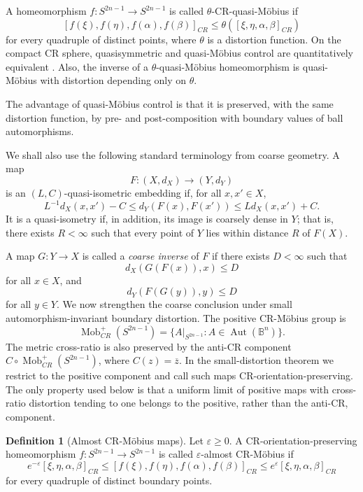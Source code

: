 \documentclass[11pt]{article}
\theoremstyle{definition}
\newtheorem{definition}[theorem]{Definition}
\theoremstyle{remark}
\theoremstyle{definition}
\newcommand{\B}{\mathbb B}
\newcommand{\Aut}{\operatorname{Aut}}
\begin{document}
A homeomorphism \(f:S^{2n-1}\to S^{2n-1}\) is called
\(\theta\)-CR-quasi-M\"obius if
\begin{equation}\label{general-cr-quasimobius}
        [f(\xi),f(\eta),f(\alpha),f(\beta)]_{CR}
        \le
        \theta\!\left([\xi,\eta,\alpha,\beta]_{CR}\right)
\end{equation}
for every quadruple of distinct points, where \(\theta\) is a distortion
function.  On the compact CR sphere, quasisymmetric and quasi-M\"obius control
are quantitatively equivalent \cite{Vaisala,Haissinsky}.  Also, the inverse of
a \(\theta\)-quasi-M\"obius homeomorphism is quasi-M\"obius with distortion
depending only on \(\theta\).

The advantage of quasi-M\"obius control is that it is preserved, with the same
distortion function, by pre- and post-composition with boundary values of ball
automorphisms.



We shall also use the following standard terminology from coarse geometry. A map
\[
F:(X,d_X)\to(Y,d_Y)
\]
is an \((L,C)\)-quasi-isometric embedding if, for all \(x,x'\in X\),
\[
L^{-1}d_X(x,x')-C
\le d_Y(F(x),F(x'))
\le Ld_X(x,x')+C.
\]
It is a quasi-isometry if, in addition, its image is coarsely dense in \(Y\); that is, there exists \(R<\infty\) such that every point of \(Y\) lies within distance \(R\) of \(F(X)\).

A map \(G:Y\to X\) is called a \emph{coarse inverse} of \(F\) if there exists \(D<\infty\) such that
\[
d_X(G(F(x)),x)\le D
\]
for all \(x\in X\), and
\[
d_Y(F(G(y)),y)\le D
\]
for all \(y\in Y\).
We now strengthen the coarse conclusion under small automorphism-invariant
boundary distortion.  The positive CR-M\"obius group is
\[
        \operatorname{Mob}_{CR}^+(S^{2n-1})
        =\{A|_{S^{2n-1}}:A\in\Aut(\B^n)\}.
\]
The metric cross-ratio is also preserved by the anti-CR component
\(C\circ\operatorname{Mob}_{CR}^+(S^{2n-1})\), where
\(C(z)=\overline z\).  In the small-distortion theorem we restrict to the
positive component and call such maps CR-orientation-preserving.  The only
property used below is that a uniform limit of positive maps with cross-ratio
distortion tending to one belongs to the positive, rather than the anti-CR,
component.

\begin{definition}[Almost CR-M\"obius maps]\label{defep}
Let \(\varepsilon\ge0\).  A CR-orientation-preserving homeomorphism
\(f:S^{2n-1}\to S^{2n-1}\) is called \(\varepsilon\)-almost CR-M\"obius if
\begin{equation}\label{almost-cr-mobius}
        e^{-\varepsilon}[\xi,\eta,\alpha,\beta]_{CR}
        \le
        [f(\xi),f(\eta),f(\alpha),f(\beta)]_{CR}
        \le
        e^{\varepsilon}[\xi,\eta,\alpha,\beta]_{CR}
\end{equation}
for every quadruple of distinct boundary points.
\end{definition}
\end{document}
